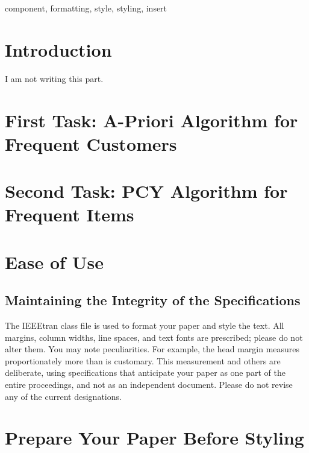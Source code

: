 \documentclass[conference]{IEEEtran}
\begin{document}
    \begin{IEEEkeywords}
        component, formatting, style, styling, insert
    \end{IEEEkeywords}

    \section{Introduction}
    \label{sec:introduction}

    I am not writing this part.

    \section{First Task: A-Priori Algorithm for Frequent Customers}
    \label{sec:first-task}
    

    \section{Second Task: PCY Algorithm for Frequent Items}
    \label{sec:second-task}
    

    \section{Ease of Use}
    \label{sec:ease-of-use}

    \subsection{Maintaining the Integrity of the Specifications}
    \label{subsec:maintaining-the-integrity-of-the-specifications}

    The IEEEtran class file is used to format your paper and style the text.
    All margins, column widths, line spaces, and text fonts are prescribed; please do not alter them.
    You may note peculiarities.
    For example, the head margin measures proportionately more than is customary.
    This measurement and others are deliberate, using specifications that anticipate your paper as one part of the entire proceedings, and not as an independent document.
    Please do not revise any of the current designations.

    \section{Prepare Your Paper Before Styling}
    \label{sec:prepare-your-paper-before-styling}
%    
\end{document}
